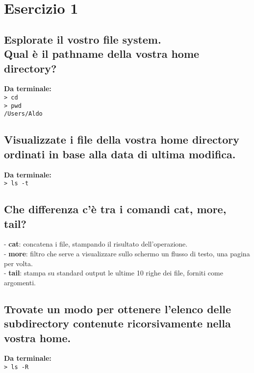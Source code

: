 \section{Esercizio 1}
 
\subsection{Esplorate il vostro file system. \\
Qual \`e il pathname della vostra home directory?}

\textbf{Da terminale:}	\\
\verb:> cd:	 \\
\verb:> pwd:  \\
\verb:/Users/Aldo:  \\


\subsection{Visualizzate i file della vostra home directory ordinati in base alla data di ultima modifica.}

\textbf{Da terminale:}		\\
\verb:> ls -t:	\\
 

\subsection{Che differenza c’\`e tra i comandi cat, more, tail?}

- \textbf{cat}: concatena i file, stampando il risultato
dell'operazione.	\\
- \textbf{more}: filtro che serve a visualizzare sullo schermo un
flusso di testo, una pagina per volta.	\\
- \textbf{tail}: stampa su standard output le ultime 10 righe dei
file, forniti come argomenti.	\\


\subsection{Trovate un modo per ottenere l’elenco delle subdirectory contenute ricorsivamente nella vostra home.}

\textbf{Da terminale:}		\\
\verb:> ls -R:	\\


